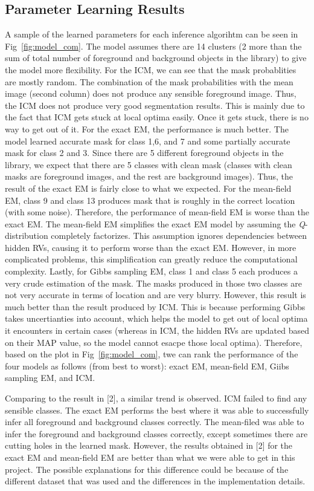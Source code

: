 \documentclass{article} %
\begin{document}
\subsection{Parameter Learning Results}
\label{parameter_result}
A sample of the learned parameters for each inference algorihtm can be seen in Fig~\ref{fig:model_com}. The model assumes there are 14 clusters (2 more than the sum of total number of foreground and background objects in the library) to give the model more flexibility. For the ICM, we can see that the mask probablities are mostly random. The combination of the mask probabilities with the mean image (second column) does not produce any sensible foreground image. Thus, the ICM does not produce very good segmentation results. This is mainly due to the fact that ICM gets stuck at local optima easily. Once it gets stuck, there is no way to get out of it.  For the exact EM, the performance is much better. The model learned accurate mask for class 1,6, and 7 and some partially accurate mask for class 2 and 3. Since there are 5 different foreground objects in the library, we expect that there are 5 classes with clean mask (classes with clean masks are foreground images, and the rest are background images). Thus, the result of the exact EM is fairly close to what we expected.  For the mean-field EM, class 9 and class 13 produces mask that is roughly in the correct location (with some noise). Therefore, the performance of mean-field EM is worse than the exact EM. The mean-field EM simplifies the exact EM model by assuming the \textit{Q}-distribution completely factorizes. This assumption ignores dependencies between hidden RVs, causing it to perform worse than the exact EM. However, in more complicated problems, this simplification can greatly reduce the computational complexity. Lastly, for Gibbs sampling EM, class 1 and class 5 each produces a very crude estimation of the mask. The masks produced in those two classes are not very accurate in terms of location and are very blurry. However, this result is much better than the result produced by ICM. This is because performing Gibbs takes uncertianties into account, which helps the model to get out of local optima it encounters in certain cases (whereas in ICM, the hidden RVs are updated based on their MAP value, so the model cannot esacpe those local optima). Therefore, based on the plot in  Fig~\ref{fig:model_com}, twe can rank the performance of the four models as follows (from best to worst): exact EM, mean-field EM, Giibs sampling EM, and ICM.

Comparing to the result in [2], a similar trend is observed. ICM failed to find any sensible classes. The exact EM performs the best where it was able to successfully infer all foreground and background classes correctly. The mean-filed was able to infer the foreground and background classes correctly, except sometimes there are cutting holes in the learned mask. However, the results obtained in [2] for the exact EM and mean-field EM are better than what we were able to get in this project. The possible explanations for this difference could be because of the different dataset that was used and the differences in the implementation details.
\end{document}
